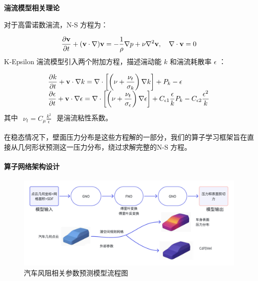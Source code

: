 \documentclass{MMCStyle}
\begin{document}
\textbf{湍流模型相关理论}



对于高雷诺数湍流，N-S 方程为：  

    \begin{eqnarray} 
    {\frac{\partial{\bf v}}{\partial t}}+({\bf v}\cdot\nabla){\bf v}=-{\frac{1}{\rho}}\nabla p+\nu\nabla^{2}{\bf v},\quad\nabla\cdot{\bf v}=0
    \end{eqnarray}
K-Epsilon 湍流模型引入两个附加方程，描述湍动能 $k$ 和湍流耗散率 $\epsilon$ ：  


    \begin{eqnarray} 
    \begin{array}{l}{\displaystyle\frac{\partial k}{\partial t}+{\bf v}\cdot\nabla k=\nabla\cdot\left[\left(\nu+\frac{\nu_{t}}{\sigma_{k}}\right)\nabla k\right]+P_{k}-\epsilon}\\ {\displaystyle\frac{\partial\epsilon}{\partial t}+{\bf v}\cdot\nabla\epsilon=\nabla\cdot\left[\left(\nu+\frac{\nu_{t}}{\sigma_{\epsilon}}\right)\nabla\epsilon\right]+C_{\epsilon1}\frac{\epsilon}{k}P_{k}-C_{\epsilon2}\frac{\epsilon^{2}}{k}}\end{array}
    \end{eqnarray}
其中 $\begin{array}{r}{\nu_{t}=C_{\mu}\frac{k^{2}}{\epsilon}}\end{array}$ 是湍流粘性系数。  

在稳态情况下，壁面压力分布是这些方程解的一部分，我们的算子学习框架旨在直接从几何形状预测这一压力分布，绕过求解完整的N-S 方程。  

\paragraph{算子网络架构设计}

\begin{figure}[H]
\centering%
\includegraphics[width=13 cm]{figure/fig9.pdf}
\caption{汽车风阻相关参数预测模型流程图}\label{fig9}
\end{figure}   
\unskip
\end{document}
